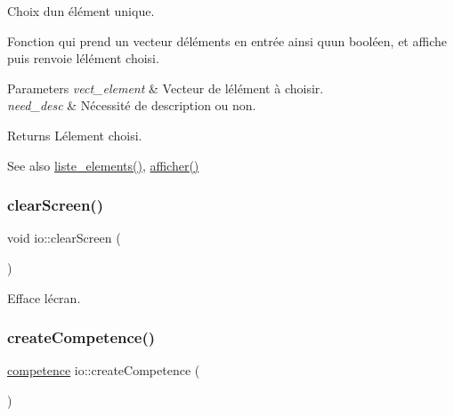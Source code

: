 Choix d\textquotesingle{}un élément unique. 

Fonction qui prend un vecteur d\textquotesingle{}éléments en entrée ainsi qu\textquotesingle{}un booléen, et affiche puis renvoie l\textquotesingle{}élément choisi. 
\begin{DoxyParams}{Parameters}
{\em vect\+\_\+element} & Vecteur de l\textquotesingle{}élément à choisir. \\
\hline
{\em need\+\_\+desc} & Nécessité de description ou non. \\
\hline
\end{DoxyParams}
\begin{DoxyReturn}{Returns}
L\textquotesingle{}élement choisi. 
\end{DoxyReturn}
\begin{DoxySeeAlso}{See also}
\hyperlink{namespaceio_acf5693654c155fd094993bf20ac39343}{liste\+\_\+elements()}, \hyperlink{namespaceio_ac5222293c3d12f7982a8df7ead04ba0b}{afficher()} 
\end{DoxySeeAlso}
\mbox{\label{namespaceio_abefd9b2fada48d5e8e260e56e868e952}} 
\subsubsection{\texorpdfstring{clear\+Screen()}{clearScreen()}}
{\footnotesize\ttfamily void io\+::clear\+Screen (\begin{DoxyParamCaption}{ }\end{DoxyParamCaption})}



Efface l\textquotesingle{}écran. 

\mbox{\label{namespaceio_a474f817675f4aa2e28f1dac572046eb5}} 
\subsubsection{\texorpdfstring{create\+Competence()}{createCompetence()}}
{\footnotesize\ttfamily \hyperlink{classcompetence}{competence} io\+::create\+Competence (\begin{DoxyParamCaption}{ }\end{DoxyParamCaption})}



